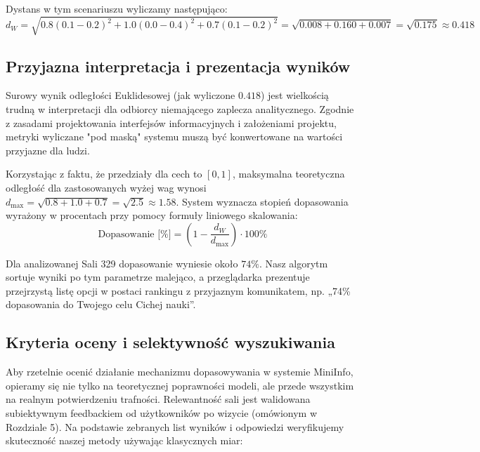 \documentclass[14pt,a4paper]{extarticle}
\begin{document}
Dystans w tym scenariuszu wyliczamy następująco:
\begin{equation}
d_W = \sqrt{0.8(0.1 - 0.2)^2 + 1.0(0.0 - 0.4)^2 + 0.7(0.1 - 0.2)^2} = \sqrt{0.008 + 0.160 + 0.007} = \sqrt{0.175} \approx 0.418
\end{equation}

\subsection{Przyjazna interpretacja i prezentacja wyników}
Surowy wynik odległości Euklidesowej (jak wyliczone $0.418$) jest wielkością trudną w interpretacji dla odbiorcy niemającego zaplecza analitycznego. Zgodnie z zasadami projektowania interfejsów informacyjnych i założeniami projektu, metryki wyliczane "pod maską" systemu muszą być konwertowane na wartości przyjazne dla ludzi.

Korzystając z faktu, że przedziały dla cech to $[0, 1]$, maksymalna teoretyczna odległość dla zastosowanych wyżej wag wynosi $d_{\text{max}} = \sqrt{0.8+1.0+0.7} = \sqrt{2.5} \approx 1.58$. System wyznacza stopień dopasowania wyrażony w procentach przy pomocy formuły liniowego skalowania:
\begin{equation}
\text{Dopasowanie [\%]} = \left(1 - \frac{d_W}{d_{\text{max}}}\right) \cdot 100\%
\end{equation}

Dla analizowanej Sali 329 dopasowanie wyniesie około $74\%$. Nasz algorytm sortuje wyniki po tym parametrze malejąco, a przeglądarka prezentuje przejrzystą listę opcji w postaci rankingu z przyjaznym komunikatem, np. „74\% dopasowania do Twojego celu Cichej nauki”.

\subsection{Kryteria oceny i selektywność wyszukiwania}
Aby rzetelnie ocenić działanie mechanizmu dopasowywania w systemie MiniInfo, opieramy się nie tylko na teoretycznej poprawności modeli, ale przede wszystkim na realnym potwierdzeniu trafności. Relewantność sali jest walidowana subiektywnym feedbackiem od użytkowników po wizycie (omówionym w Rozdziale 5). Na podstawie zebranych list wyników i odpowiedzi weryfikujemy skuteczność naszej metody używając klasycznych miar:
\end{document}
